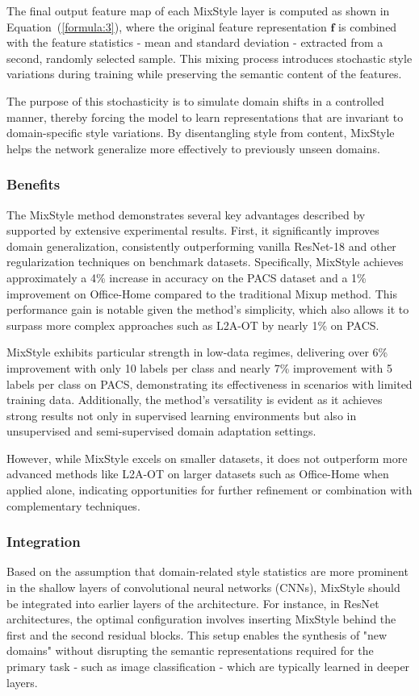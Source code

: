 The final output feature map of each MixStyle layer is computed as shown in Equation~(\ref{formula:3}), where the original feature representation $\mathbf{f}$ is combined with the feature statistics - mean and standard deviation - extracted from a second, randomly selected sample. This mixing process introduces stochastic style variations during training while preserving the semantic content of the features.

The purpose of this stochasticity is to simulate domain shifts in a controlled manner, thereby forcing the model to learn representations that are invariant to domain-specific style variations. By disentangling style from content, MixStyle helps the network generalize more effectively to previously unseen domains.

\subsubsection{Benefits}
The MixStyle method demonstrates several key advantages described by \cite{mixstyle_ref} supported by extensive experimental results. First, it significantly improves domain generalization, consistently outperforming vanilla ResNet-18 and other regularization techniques on benchmark datasets. Specifically, MixStyle achieves approximately a 4\% increase in accuracy on the PACS dataset and a 1\% improvement on Office-Home compared to the traditional Mixup method. This performance gain is notable given the method’s simplicity, which also allows it to surpass more complex approaches such as L2A-OT by nearly 1\% on PACS.

MixStyle exhibits particular strength in low-data regimes, delivering over 6\% improvement with only 10 labels per class and nearly 7\% improvement with 5 labels per class on PACS, demonstrating its effectiveness in scenarios with limited training data. Additionally, the method’s versatility is evident as it achieves strong results not only in supervised learning environments but also in unsupervised and semi-supervised domain adaptation settings.

However, while MixStyle excels on smaller datasets, it does not outperform more advanced methods like L2A-OT on larger datasets such as Office-Home when applied alone, indicating opportunities for further refinement or combination with complementary techniques.

\subsubsection{Integration}
Based on the assumption that domain-related style statistics are more prominent in the shallow layers of convolutional neural networks (CNNs), MixStyle should be integrated into earlier layers of the architecture. For instance, in ResNet architectures, the optimal configuration involves inserting MixStyle behind the first and the second residual blocks. This setup enables the synthesis of "new domains" without disrupting the semantic representations required for the primary task - such as image classification - which are typically learned in deeper layers.

